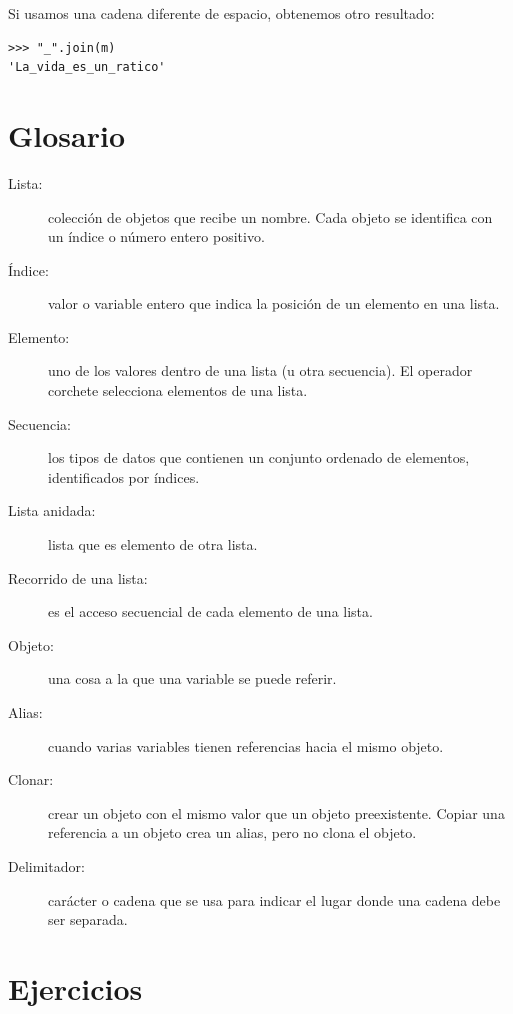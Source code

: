 Si usamos una cadena diferente de espacio, obtenemos otro resultado:
\begin{verbatim}
>>> "_".join(m)
'La_vida_es_un_ratico'
\end{verbatim}

\section{Glosario}
\begin{description}
\item [{Lista:}] colección de objetos que recibe un nombre. Cada objeto
se identifica con un índice o número entero positivo.
\item [{Índice:}] valor o variable entero que indica la posición de un
elemento en una lista.
\item [{Elemento:}] uno de los valores dentro de una lista (u otra secuencia).
El operador corchete selecciona elementos de una lista.
\item [{Secuencia:}] los tipos de datos que contienen un conjunto ordenado
de elementos, identificados por índices.
\item [{Lista anidada:}] lista que es elemento de otra lista.
\item [{Recorrido de una lista:}] es el acceso secuencial de cada elemento
de una lista.
\item [{Objeto:}] una cosa a la que una variable se puede referir.
\item [{Alias:}] cuando varias variables tienen referencias hacia el mismo
objeto.
\item [{Clonar:}] crear un objeto con el mismo valor que un objeto preexistente.
Copiar una referencia a un objeto crea un alias, pero no clona el
objeto.
\item [{Delimitador:}] carácter o cadena que se usa para indicar el lugar
donde una cadena debe ser separada.

   
  
  
\end{description}

\section{Ejercicios}


